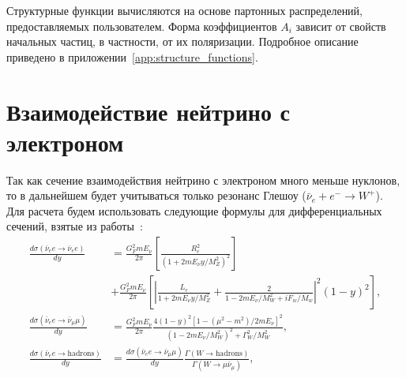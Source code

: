 Структурные функции вычисляются на основе партонных распределений, предоставляемых пользователем. Форма коэффициентов $A_i$ зависит от свойств начальных частиц, в частности, от их поляризации. Подробное описание приведено в приложении~\ref{app:structure_functions}.
\section{Взаимодействие нейтрино с электроном}
Так как сечение взаимодействия нейтрино с электроном много меньше нуклонов, то в дальнейшем будет учитываться только резонанс Глешоу ($\bar{\nu}_e+e^{-}\to W^{+}$). Для расчета будем использовать следующие формулы для дифференциальных сечений, взятые из работы~\cite{GANDHI199681}:
\begin{equation}
    \begin{aligned}
\frac{d\sigma(\bar{\nu}_e e \rightarrow \bar{\nu}_e e)}{dy} 
&= \frac{G_F^2 m E_\nu}{2\pi} \left[ \frac{R_e^2}{\left( 1 + 2m E_\nu y / M_Z^2 \right)^2}\right]\\ 
&+ \frac{G_F^2 m E_\nu}{2\pi}\left[\left| \frac{L_e}{1 + 2m E_\nu y / M_Z^2} + \frac{2}{1 - 2m E_\nu / M_W^2 + i F_w / M_w} \right|^2 (1 - y)^2 \right],\\
\frac{d\sigma(\bar{\nu}_e e \rightarrow \bar{\nu}_\mu \mu)}{dy} 
&= \frac{G_F^2 m E_\nu}{2\pi} \frac{4(1-y)^2 [1-(\mu^2-m^2)/2mE_\nu]^2}{(1-2mE_\nu/M_W^2)^2 + \Gamma_W^2/M_W^2}, \\
\frac{d\sigma(\bar{\nu}_e e \rightarrow \text{hadrons})}{dy} 
&= \frac{d\sigma(\bar{\nu}_e e \rightarrow \bar{\nu}_\mu \mu)}{dy} \frac{\Gamma(W \rightarrow \text{hadrons})}{\Gamma(W \rightarrow \mu \bar{\nu}_\mu)},
\end{aligned}
\end{equation}
